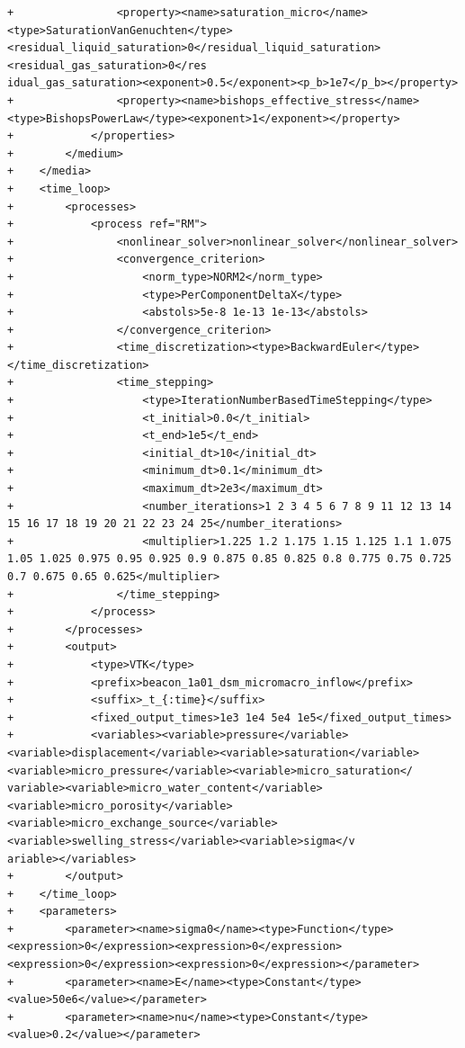 \documentclass[10pt]{article}
\begin{document}
\begin{lstlisting}
+                <property><name>saturation_micro</name><type>SaturationVanGenuchten</type><residual_liquid_saturation>0</residual_liquid_saturation><residual_gas_saturation>0</res
idual_gas_saturation><exponent>0.5</exponent><p_b>1e7</p_b></property>
+                <property><name>bishops_effective_stress</name><type>BishopsPowerLaw</type><exponent>1</exponent></property>
+            </properties>
+        </medium>
+    </media>
+    <time_loop>
+        <processes>
+            <process ref="RM">
+                <nonlinear_solver>nonlinear_solver</nonlinear_solver>
+                <convergence_criterion>
+                    <norm_type>NORM2</norm_type>
+                    <type>PerComponentDeltaX</type>
+                    <abstols>5e-8 1e-13 1e-13</abstols>
+                </convergence_criterion>
+                <time_discretization><type>BackwardEuler</type></time_discretization>
+                <time_stepping>
+                    <type>IterationNumberBasedTimeStepping</type>
+                    <t_initial>0.0</t_initial>
+                    <t_end>1e5</t_end>
+                    <initial_dt>10</initial_dt>
+                    <minimum_dt>0.1</minimum_dt>
+                    <maximum_dt>2e3</maximum_dt>
+                    <number_iterations>1 2 3 4 5 6 7 8 9 11 12 13 14 15 16 17 18 19 20 21 22 23 24 25</number_iterations>
+                    <multiplier>1.225 1.2 1.175 1.15 1.125 1.1 1.075 1.05 1.025 0.975 0.95 0.925 0.9 0.875 0.85 0.825 0.8 0.775 0.75 0.725 0.7 0.675 0.65 0.625</multiplier>
+                </time_stepping>
+            </process>
+        </processes>
+        <output>
+            <type>VTK</type>
+            <prefix>beacon_1a01_dsm_micromacro_inflow</prefix>
+            <suffix>_t_{:time}</suffix>
+            <fixed_output_times>1e3 1e4 5e4 1e5</fixed_output_times>
+            <variables><variable>pressure</variable><variable>displacement</variable><variable>saturation</variable><variable>micro_pressure</variable><variable>micro_saturation</
variable><variable>micro_water_content</variable><variable>micro_porosity</variable><variable>micro_exchange_source</variable><variable>swelling_stress</variable><variable>sigma</v
ariable></variables>
+        </output>
+    </time_loop>
+    <parameters>
+        <parameter><name>sigma0</name><type>Function</type><expression>0</expression><expression>0</expression><expression>0</expression><expression>0</expression></parameter>
+        <parameter><name>E</name><type>Constant</type><value>50e6</value></parameter>
+        <parameter><name>nu</name><type>Constant</type><value>0.2</value></parameter>

\end{lstlisting}
\end{document}
